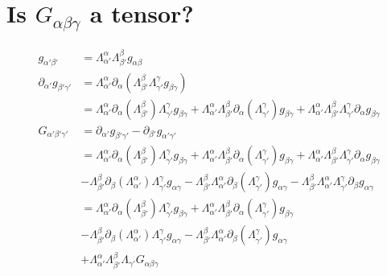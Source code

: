 \documentclass[11pt]{article}
\begin{document}
\section{Is $G_{\alpha\beta\gamma}$ a tensor?}
\begin{equation*}
	\begin{aligned}
		g_{\alpha'\beta'}&=\Lambda_{\alpha'}^{\alpha}\Lambda_{\beta'}^{\beta}g_{\alpha\beta} \\
		\partial_{\alpha'}g_{\beta'\gamma'}&=\Lambda_{\alpha'}^{\alpha}\partial_{\alpha}\left(\Lambda_{\beta'}^{\beta}\Lambda_{\gamma'}^{\gamma}g_{\beta\gamma}\right) \\
		&=\Lambda_{\alpha'}^{\alpha}\partial_{\alpha}\left(\Lambda_{\beta'}^{\beta}\right)\Lambda_{\gamma'}^{\gamma}g_{\beta\gamma} + \Lambda_{\alpha'}^{\alpha}\Lambda_{\beta'}^{\beta}\partial_{\alpha}\left(\Lambda_{\gamma'}^{\gamma}\right)g_{\beta\gamma} + \Lambda_{\alpha'}^{\alpha}\Lambda_{\beta'}^{\beta}\Lambda_{\gamma'}^{\gamma}\partial_{\alpha}g_{\beta\gamma}\\
		G_{\alpha'\beta'\gamma'} &= \partial_{\alpha'}g_{\beta'\gamma'} - \partial_{\beta'}g_{\alpha'\gamma'}\\
		&= \Lambda_{\alpha'}^{\alpha}\partial_{\alpha}\left(\Lambda_{\beta'}^{\beta}\right)\Lambda_{\gamma'}^{\gamma}g_{\beta\gamma} + \Lambda_{\alpha'}^{\alpha}\Lambda_{\beta'}^{\beta}\partial_{\alpha}\left(\Lambda_{\gamma'}^{\gamma}\right)g_{\beta\gamma} + \Lambda_{\alpha'}^{\alpha}\Lambda_{\beta'}^{\beta}\Lambda_{\gamma'}^{\gamma}\partial_{\alpha}g_{\beta\gamma}\\
		&-\Lambda_{\beta'}^{\beta}\partial_{\beta}\left(\Lambda_{\alpha'}^{\alpha}\right)\Lambda_{\gamma'}^{\gamma}g_{\alpha\gamma} - \Lambda_{\beta'}^{\beta}\Lambda_{\alpha'}^{\alpha}\partial_{\beta}\left(\Lambda_{\gamma'}^{\gamma}\right)g_{\alpha\gamma} - \Lambda_{\beta'}^{\beta}\Lambda_{\alpha'}^{\alpha}\Lambda_{\gamma'}^{\gamma}\partial_{\beta}g_{\alpha\gamma}\\
		&=\Lambda_{\alpha'}^{\alpha}\partial_{\alpha}\left(\Lambda_{\beta'}^{\beta}\right)\Lambda_{\gamma'}^{\gamma}g_{\beta\gamma} + \Lambda_{\alpha'}^{\alpha}\Lambda_{\beta'}^{\beta}\partial_{\alpha}\left(\Lambda_{\gamma'}^{\gamma}\right)g_{\beta\gamma}\\
		&-\Lambda_{\beta'}^{\beta}\partial_{\beta}\left(\Lambda_{\alpha'}^{\alpha}\right)\Lambda_{\gamma'}^{\gamma}g_{\alpha\gamma} - \Lambda_{\beta'}^{\beta}\Lambda_{\alpha'}^{\alpha}\partial_{\beta}\left(\Lambda_{\gamma'}^{\gamma}\right)g_{\alpha\gamma}\\
		&+\Lambda_{\alpha'}^{\alpha}\Lambda_{\beta'}^{\beta}\Lambda_{\gamma'} G_{\alpha\beta\gamma} \\

\end{aligned}
\end{equation*}
\end{document}
